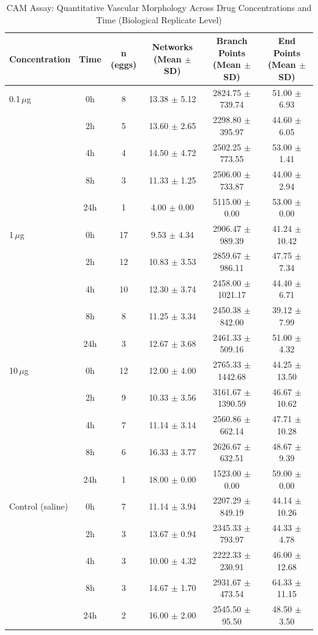 \begin{table}[htbp]
\centering
\caption{CAM Assay: Quantitative Vascular Morphology Across Drug Concentrations and Time (Biological Replicate Level)}
\label{tab:egg_embryo_growth}
\small
\begin{tabular}{lccccc}
\toprule
\textbf{Concentration} & \textbf{Time} & \textbf{n (eggs)} & \textbf{Networks (Mean $\pm$ SD)} & \textbf{Branch Points (Mean $\pm$ SD)} & \textbf{End Points (Mean $\pm$ SD)} \\ \midrule
0.1\,$\mu$g & 0h & 8 & 13.38 $\pm$ 5.12 & 2824.75 $\pm$ 739.74 & 51.00 $\pm$ 6.93 \\
 & 2h & 5 & 13.60 $\pm$ 2.65 & 2298.80 $\pm$ 395.97 & 44.60 $\pm$ 6.05 \\
 & 4h & 4 & 14.50 $\pm$ 4.72 & 2502.25 $\pm$ 773.55 & 53.00 $\pm$ 1.41 \\
 & 8h & 3 & 11.33 $\pm$ 1.25 & 2506.00 $\pm$ 733.87 & 44.00 $\pm$ 2.94 \\
 & 24h & 1 & 4.00 $\pm$ 0.00 & 5115.00 $\pm$ 0.00 & 53.00 $\pm$ 0.00 \\ \midrule
1\,$\mu$g & 0h & 17 & 9.53 $\pm$ 4.34 & 2906.47 $\pm$ 989.39 & 41.24 $\pm$ 10.42 \\
 & 2h & 12 & 10.83 $\pm$ 3.53 & 2859.67 $\pm$ 986.11 & 47.75 $\pm$ 7.34 \\
 & 4h & 10 & 12.30 $\pm$ 3.74 & 2458.00 $\pm$ 1021.17 & 44.40 $\pm$ 6.71 \\
 & 8h & 8 & 11.25 $\pm$ 3.34 & 2450.38 $\pm$ 842.00 & 39.12 $\pm$ 7.99 \\
 & 24h & 3 & 12.67 $\pm$ 3.68 & 2461.33 $\pm$ 509.16 & 51.00 $\pm$ 4.32 \\ \midrule
10\,$\mu$g & 0h & 12 & 12.00 $\pm$ 4.00 & 2765.33 $\pm$ 1442.68 & 44.25 $\pm$ 13.50 \\
 & 2h & 9 & 10.33 $\pm$ 3.56 & 3161.67 $\pm$ 1390.59 & 46.67 $\pm$ 10.62 \\
 & 4h & 7 & 11.14 $\pm$ 3.14 & 2560.86 $\pm$ 662.14 & 47.71 $\pm$ 10.28 \\
 & 8h & 6 & 16.33 $\pm$ 3.77 & 2626.67 $\pm$ 632.51 & 48.67 $\pm$ 9.39 \\
 & 24h & 1 & 18.00 $\pm$ 0.00 & 1523.00 $\pm$ 0.00 & 59.00 $\pm$ 0.00 \\ \midrule
Control (saline) & 0h & 7 & 11.14 $\pm$ 3.94 & 2207.29 $\pm$ 849.19 & 44.14 $\pm$ 10.26 \\
 & 2h & 3 & 13.67 $\pm$ 0.94 & 2345.33 $\pm$ 793.97 & 44.33 $\pm$ 4.78 \\
 & 4h & 3 & 10.00 $\pm$ 4.32 & 2222.33 $\pm$ 230.91 & 46.00 $\pm$ 12.68 \\
 & 8h & 3 & 14.67 $\pm$ 1.70 & 2931.67 $\pm$ 473.54 & 64.33 $\pm$ 11.15 \\
 & 24h & 2 & 16.00 $\pm$ 2.00 & 2545.50 $\pm$ 95.50 & 48.50 $\pm$ 3.50 \\
\bottomrule
\end{tabular}
\end{table}

